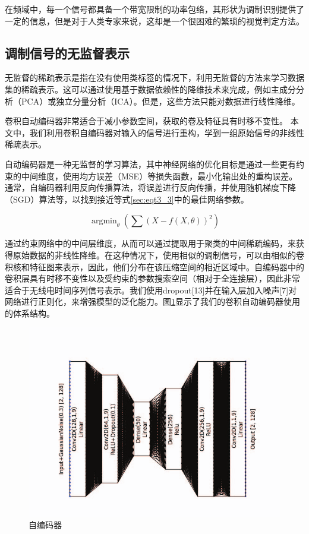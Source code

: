 在频域中，每一个信号都具备一个带宽限制的功率包络，其形状为调制识别提供了一定的信息，但是对于人类专家来说，这却是一个很困难的繁琐的视觉判定方法。\par

\subsection{调制信号的无监督表示}

无监督的稀疏表示是指在没有使用类标签的情况下，利用无监督的方法来学习数据集的稀疏表示。这可以通过使用基于数据依赖性的降维技术来完成，例如主成分分析（PCA）或独立分量分析（ICA）。但是，这些方法只能对数据进行线性降维。\par

卷积自动编码器非常适合于减小参数空间，获取的卷及特征具有时移不变性。 本文中，我们利用卷积自编码器对输入的信号进行重构，学到一组原始信号的非线性稀疏表示。\par

自动编码器是一种无监督的学习算法，其中神经网络的优化目标是通过一些更有约束的中间维度，使用均方误差（MSE）等损失函数，最小化输出处的重构误差。通常，自编码器利用反向传播算法，将误差进行反向传播，并使用随机梯度下降（SGD）算法等，以找到接近等式\ref{sec:eqt3_3}中的最佳网络参数。

\begin{equation}\label{sec:eqt3_3}
	\mathop{\arg\min}_{\theta}(\sum(X − f (X,\theta))^2)
\end{equation}

通过约束网络中的中间层维度，从而可以通过提取用于聚类的中间稀疏编码，来获得原始数据的非线性降维。在这种情况下，使用相似的调制信号，可以由相似的卷积核和特征图来表示，因此，他们分布在该压缩空间的相近区域中。自编码器中的卷积层具有时移不变性以及受约束的参数搜索空间（相对于全连接层），因此非常适合于无线电时间序列信号表示。我们使用dropout[13]并在输入层加入噪声[7]对网络进行正则化，来增强模型的泛化能力。图\ref{fig_3_2}显示了我们的卷积自动编码器使用的体系结构。\par

\begin{figure}[!h]
	\centering
	\includegraphics[scale=0.3]{figures/chapter_3/CAE}
	\caption{自编码器}	\label{fig_3_2}
\end{figure}

